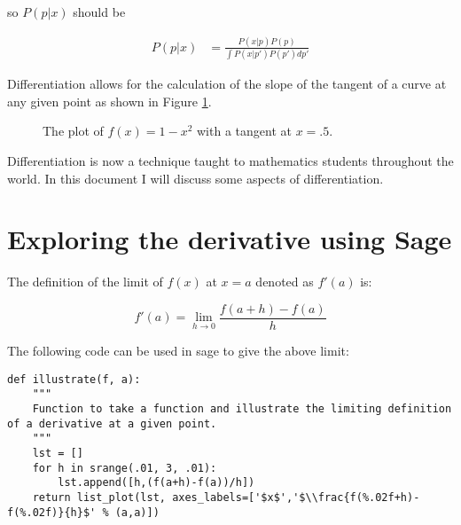 \documentclass[a4paper]{article}
\begin{document}
so $P(p | x)$ should be 

\begin{equation}
    \begin{aligned}
        P(p | x) &= \frac{P(x|p) P(p)}{\int P(x|p') P(p') dp'}
    \end{aligned}
\end{equation}

















Differentiation allows for the calculation of the slope of the tangent of a curve at any given point as shown in Figure \ref{exampleplot}.

\begin{figure}[!htbp]
\begin{center}
\end{center}
\caption{The plot of $f(x)=1-x^2$ with a tangent at $x=.5$.}\label{exampleplot}
\end{figure}

Differentiation is now a technique taught to mathematics students throughout the world. In this document I will discuss some aspects of differentiation.

\section{Exploring the derivative using Sage}

The definition of the limit of $f(x)$ at $x=a$ denoted as $f'(a)$ is:

\begin{equation}
f'(a) = \lim_{h\to0}\frac{f(a+h)-f(a)}{h}
\end{equation}

The following code can be used in sage to give the above limit:

\begin{verbatim}
def illustrate(f, a):
    """
    Function to take a function and illustrate the limiting definition of a derivative at a given point.
    """
    lst = []
    for h in srange(.01, 3, .01):
        lst.append([h,(f(a+h)-f(a))/h])
    return list_plot(lst, axes_labels=['$x$','$\\frac{f(%.02f+h)-f(%.02f)}{h}$' % (a,a)])
\end{verbatim}
\end{document}
